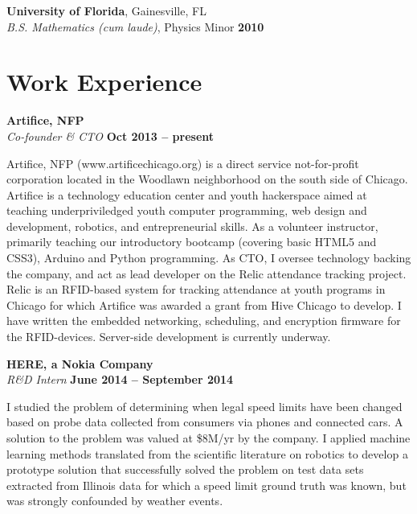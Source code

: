 \documentclass[margin,line]{resume}
\begin{document}
\begin{resume}
    \textbf{University of Florida}, Gainesville, FL \vspace{2mm} \\
    \vspace{1mm}
    \textsl{B.S. Mathematics (cum laude)}, Physics Minor \hfill \textbf{2010}\vspace{-3mm}\\\vspace{-1mm}%
    \vspace{-2mm}

    \section{\mysidestyle Work Experience}

    \textbf{Artifice, NFP} \\
    \textsl{Co-founder \& CTO} \hfill \textbf{Oct 2013 -- present} \vspace{-3mm}

    Artifice, NFP (www.artificechicago.org) is a direct service not-for-profit corporation located in the Woodlawn neighborhood on the south side of Chicago.  Artifice is a technology education center and youth hackerspace aimed at teaching underpriviledged youth computer programming, web design and development, robotics, and entrepreneurial skills.  As a volunteer instructor, primarily teaching our introductory bootcamp (covering basic HTML5 and CSS3), Arduino and Python programming.
    As CTO, I oversee technology backing the company, and act as lead developer on the Relic attendance tracking project.  Relic is an RFID-based system for tracking attendance at youth programs in Chicago for which Artifice was awarded a grant from Hive Chicago to develop.  I have written the embedded networking, scheduling, and encryption firmware for the RFID-devices.  Server-side development is currently underway.
    \vspace{-2mm}

    \textbf{HERE, a Nokia Company} \\
    \textsl{R\&D Intern} \hfill \textbf{June 2014 -- September 2014} \vspace{-3mm}

    I studied the problem of determining when legal speed limits have been changed based on probe data collected from consumers via phones and connected cars.  A solution to the problem was valued at \$8M/yr by the company.  I applied machine learning methods translated from the scientific literature on robotics to develop a prototype solution that successfully solved the problem on test data sets extracted from Illinois data for which a speed limit ground truth was known, but was strongly confounded by weather events.
    

\end{resume}
\end{document}
